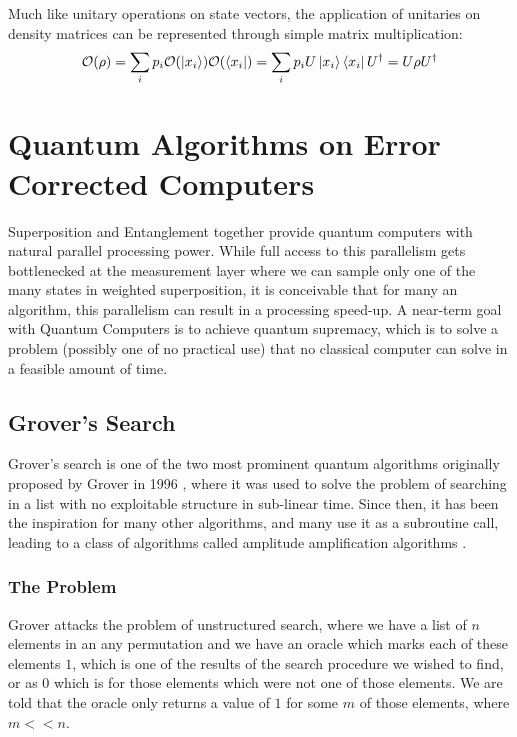Much like unitary operations on state vectors, the application of unitaries on density matrices can be represented through simple matrix multiplication:
\begin{equation}
    \mathcal{O} (\rho) = \sum_i p_i \mathcal{O}(\ket{x_i}) \mathcal{O}(\bra{x_i}) = \sum_i p_i U \ket{x_i} \bra{x_i} U^\dagger = U \rho U^\dagger
\end{equation}


\section{Quantum Algorithms on Error Corrected Computers}

Superposition and Entanglement together provide quantum computers with natural parallel processing power. While full access to this parallelism gets bottlenecked at the measurement layer where we can sample only one of the many states in weighted superposition, it is conceivable that for many an algorithm, this parallelism can result in a processing speed-up. A near-term goal with Quantum Computers is to achieve quantum supremacy, which is to solve a problem (possibly one of no practical use) that no classical computer can solve in a feasible amount of time. \cite{quantum-complexity-survey}


\subsection{Grover's Search}

Grover's search is one of the two most prominent quantum algorithms originally proposed by Grover in 1996 \cite{grover-search-original}, where it was used to solve the problem of searching in a list with no exploitable structure in sub-linear time. Since then, it has been the inspiration for many other algorithms, and many use it as a subroutine call, leading to a class of algorithms called amplitude amplification algorithms \cite{quantum-amplitude-amplification-algorithms}.

\subsubsection{The Problem}

Grover attacks the problem of unstructured search, where we have a list of $n$ elements in an any permutation and we have an oracle which marks each of these elements $1$, which is one of the results of the search procedure we wished to find, or as $0$ which is for those elements which were not one of those elements. We are told that the oracle only returns a value of $1$ for some $m$ of those elements, where $m << n$.

